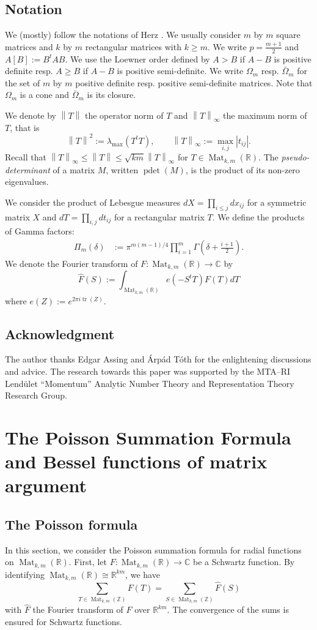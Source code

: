 \documentclass[oneside]{amsart}
\numberwithin{equation}{section}
\theoremstyle{definition}
\theoremstyle{remark}
\theoremstyle{remark}
\newcommand{\CC}{\mathbb C}								%
\newcommand{\RR}{\mathbb R}
\newcommand{\ZZ}{\mathbb Z}
\newcommand{\norm}[1]{\left\lVert #1\right\rVert}		%
\newcommand{\abs}[1]{\left\lvert #1\right\rvert}
\DeclareMathOperator{\Mat}{Mat}
\DeclareMathOperator{\tr}{tr}
\DeclareMathOperator{\pdet}{pdet}
\begin{document}
\subsection{Notation}
We (mostly) follow the notations of Herz \cite{Her55}. We usually consider $m$ by $m$ square matrices and $k$ by $m$ rectangular matrices with $k\geq m$. We write $p=\frac{m+1}2$ and $A[B]:=B^tAB$. We use the Loewner order defined by $A>B$ if $A-B$ is positive definite resp. $A\geq B$ if $A-B$ is positive semi-definite. We write $\Omega_m $ resp. $\bar\Omega_m$ for the set of $m$ by $m$ positive definite resp. positive semi-definite matrices. Note that $\Omega_m$ is a cone and $\bar\Omega_m$ is its closure.

We denote by $\norm T$ the operator norm of $T$ and $\norm T_\infty$ the maximum norm of $T$, that is
$$\norm T^2:=\lambda_{\max}(T^tT),\qquad\norm T_\infty:=\max_{i,j}\abs{t_{ij}}.$$
Recall that $\norm T_\infty\leq\norm T\leq\sqrt{km}\norm T_\infty$ for $T\in\Mat_{k,m}(\RR)$. The \emph{pseudo-determinant} of a matrix $M$, written $\pdet(M)$, is the product of its non-zero eigenvalues.

We consider the product of Lebesgue measures $dX=\prod_{i\leq j}dx_{ij}$ for a symmetric matrix $X$ and $dT=\prod_{i,j}dt_{ij}$ for a rectangular matrix $T$. We define the products of Gamma factors:
\begin{align}\label{eq definition Pi_m}
\Pi_m(\delta)&:=\pi^{m(m-1)/4}\prod_{i=1}^m\Gamma\left(\delta+\frac{i+1}2\right).
\end{align}
We denote the Fourier transform of $F:\Mat_{k,m}(\RR)\to\CC$ by
$$\hat F(S):=\int_{\Mat_{k,m}(\RR)}e(-S^tT)F(T)dT$$
where $e(Z):=e^{2\pi i\tr(Z)}$.

\subsection{Acknowledgment}
The author thanks Edgar Assing and Árpád Tóth for the enlightening discussions and advice. The research towards this paper was supported by the MTA–RI Lendület “Momentum” Analytic Number Theory and Representation Theory Research Group.



\section{The Poisson Summation Formula and Bessel functions of matrix argument}

\subsection{The Poisson formula}\label{sec Poisson summation}
In this section, we consider the Poisson summation formula for radial functions on $\Mat_{k,m}(\RR)$. First, let $F:\Mat_{k,m}(\RR)\to\CC$ be a Schwartz function. By identifying $\Mat_{k,m}(\RR)\cong\RR^{km}$, we have
$$\sum_{T\in\Mat_{k,m}(\ZZ)}F(T)=\sum_{S\in\Mat_{k,m}(\ZZ)}\hat F(S)$$
with $\hat F$ the Fourier transform of $F$ over $\RR^{km}$. The convergence of the sums is ensured for Schwartz functions.
\end{document}

